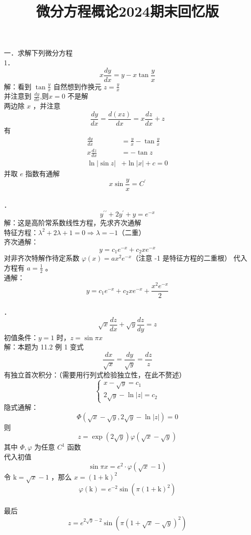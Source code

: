 \documentclass[UTF8]{ctexart}
\title{微分方程概论2024期末回忆版}
\author{\textcalligra{NULIOUS}}
\date{}
\begin{document}
\maketitle
\noindent 一．求解下列微分方程\\
1．$$x \frac{d y}{d x}=y-x \tan \frac{y}{x}$$
解：看到 $\tan \frac{y}{x}$ 自然想到作换元 $z=\frac{y}{x}$\\
并注意到 $\frac{d y}{d x} $,则$ x=0$ 不是解\\
两边除 $x$ ，并注意
$$
\frac{d y}{d x}=\frac{d(x z)}{d x}=x \frac{d z}{d x}+z$$
有
$$
\begin{aligned}
	\frac{d y}{d x}&=\frac{y}{x}-\tan \frac{y}{x}\\
 x \frac{d z}{d x}&=-\tan z\\
 \ln |\sin z|&+\ln |x|+c=0
\end{aligned}
$$
并取 $e$ 指数有通解 $$x \sin \frac{y}{x}=C^{\prime}$$\\


．$$y^{\prime}{ }^{\prime}+2 y^{\prime}+y=e^{-x}$$
解：这是高阶常系数线性方程，先求齐次通解\\
特征方程：$\lambda^{2}+2 \lambda+1=0 \Rightarrow \lambda=-1$（二重）\\
齐次通解：$$y=c_{1} e^{-x}+c_{2} x e^{-x}$$
对非齐次特解作待定系数 $\varphi(x)=a x^{2} e^{-x}$（注意 -1 是特征方程的二重根）
代入方程有 $a=\frac{1}{2}$ 。\\
通解：$$y=c_{1} e^{-x}+c_{2} x e^{-x}+\frac{x^{2} e^{-x}}{2}$$\\


．$$\sqrt{x} \frac{d z}{d x}+\sqrt{y} \frac{d z}{d y}=z$$
初值条件：$y=1$ 时，$z=\sin \pi x$\\
解：本题为 11.2 例 1 变式\\
$$\frac{d x}{\sqrt{x}}=\frac{d y}{\sqrt{y}}=\frac{d z}{z}$$
有独立首次积分：（需要用行列式检验独立性，在此不赘述）
$$
\left\{\begin{array}{l}
x-\sqrt{y}=c_{1} \\
2 \sqrt{y}-\ln |z|=c_{2}
\end{array}\right.
$$
隐式通解：$$\Phi(\sqrt{x}-\sqrt{y}, 2 \sqrt{y}-\ln |z|)=0$$
则
$$ z=\exp (2 \sqrt{y}) \varphi(\sqrt{x}-\sqrt{y})$$
其中 $\Phi, \varphi$ 为任意 $C^1$ 函数\\
代入初值 $$\sin \pi x=e^{2} \cdot \varphi(\sqrt{x}-1)$$
令 $\mathrm{k}=\sqrt{x}-1$ ，那么 $x=(1+\mathrm{k})^{2}$\\
$$\varphi(\mathrm{k})=e^{-2} \sin \left(\pi(1+\mathrm{k})^{2}\right)$$\\
最后
$$ z=e^{2 \sqrt{y}-2} \sin \left(\pi(1+\sqrt{x}-\sqrt{y})^{2}\right)$$\\
\end{document}
